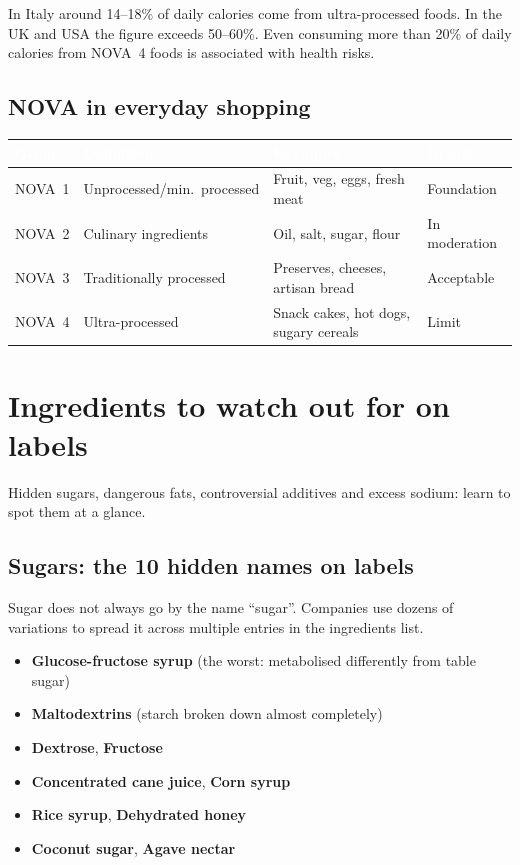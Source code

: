 \documentclass[a5paper,12pt,oneside,openany]{book}
\newcommand{\boxred}[2]{%
  \begin{tcolorbox}[boxbase,
    colback=warnred!8!white, colframe=warnred, title={#1}]
  #2\end{tcolorbox}}
\begin{document}
\boxred{Key data}{In Italy around 14--18\% of daily calories come from
ultra-processed foods. In the UK and USA the figure exceeds 50--60\%.
Even consuming more than 20\% of daily calories from NOVA~4 foods is
associated with health risks.}

\section{NOVA in everyday shopping}

{\small
\begin{tabularx}{\textwidth}{|L|L|L|L|}
\hline
{}
\textcolor{white}{\textbf{Group}}
  & \textcolor{white}{\textbf{Definition}}
  & \textcolor{white}{\textbf{Examples}}
  & \textcolor{white}{\textbf{In diet}} \\
\hline
NOVA~1 & Unprocessed/min.\ processed & Fruit, veg, eggs, fresh meat & Foundation \\
\hline
NOVA~2 & Culinary ingredients & Oil, salt, sugar, flour & In moderation \\
\hline
NOVA~3 & Traditionally processed & Preserves, cheeses, artisan bread & Acceptable \\
\hline
NOVA~4 & Ultra-processed & Snack cakes, hot dogs, sugary cereals & Limit \\
\hline
\end{tabularx}
}

\chapter{Ingredients to watch out for on labels}

Hidden sugars, dangerous fats, controversial additives and excess sodium:
learn to spot them at a glance.

\section{Sugars: the 10 hidden names on labels}

Sugar does not always go by the name ``sugar''. Companies use dozens of
variations to spread it across multiple entries in the ingredients list.

\begin{itemize}
  \item \textbf{Glucose-fructose syrup} (the worst: metabolised
    differently from table sugar)
  \item \textbf{Maltodextrins} (starch broken down almost completely)
  \item \textbf{Dextrose}, \textbf{Fructose}
  \item \textbf{Concentrated cane juice}, \textbf{Corn syrup}
  \item \textbf{Rice syrup}, \textbf{Dehydrated honey}
  \item \textbf{Coconut sugar}, \textbf{Agave nectar}
\end{itemize}
\end{document}
